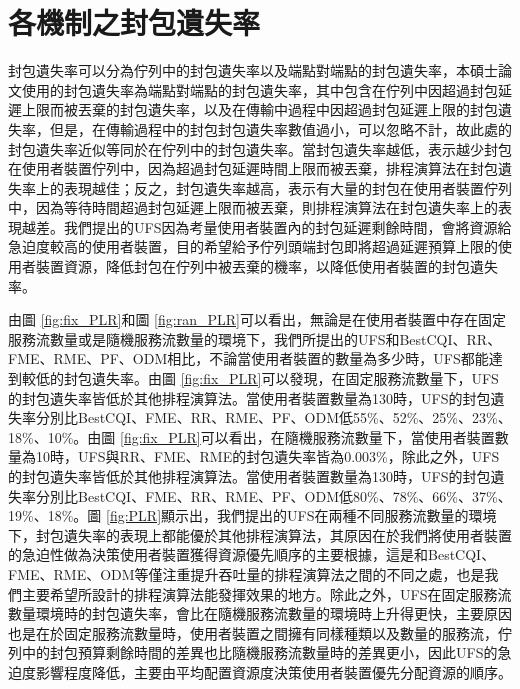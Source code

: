 \section{各機制之封包遺失率}
封包遺失率可以分為佇列中的封包遺失率以及端點對端點的封包遺失率，本碩士論文使用的封包遺失率為端點對端點的封包遺失率，其中包含在佇列中因超過封包延遲上限而被丟棄的封包遺失率，以及在傳輸中過程中因超過封包延遲上限的封包遺失率，但是，在傳輸過程中的封包封包遺失率數值過小，可以忽略不計，故此處的封包遺失率近似等同於在佇列中的封包遺失率。當封包遺失率越低，表示越少封包在使用者裝置佇列中，因為超過封包延遲時間上限而被丟棄，排程演算法在封包遺失率上的表現越佳；反之，封包遺失率越高，表示有大量的封包在使用者裝置佇列中，因為等待時間超過封包延遲上限而被丟棄，則排程演算法在封包遺失率上的表現越差。我們提出的UFS因為考量使用者裝置內的封包延遲剩餘時間，會將資源給急迫度較高的使用者裝置，目的希望給予佇列頭端封包即將超過延遲預算上限的使用者裝置資源，降低封包在佇列中被丟棄的機率，以降低使用者裝置的封包遺失率。

由圖 \ref{fig:fix_PLR}和圖 \ref{fig:ran_PLR}可以看出，無論是在使用者裝置中存在固定服務流數量或是隨機服務流數量的環境下，我們所提出的UFS和BestCQI、RR、FME、RME、PF、ODM相比，不論當使用者裝置的數量為多少時，UFS都能達到較低的封包遺失率。由圖 \ref{fig:fix_PLR}可以發現，在固定服務流數量下，UFS的封包遺失率皆低於其他排程演算法。當使用者裝置數量為130時，UFS的封包遺失率分別比BestCQI、FME、RR、RME、PF、ODM低55\%、52\%、25\%、23\%、18\%、10\%。由圖 \ref{fig:fix_PLR}可以看出，在隨機服務流數量下，當使用者裝置數量為10時，UFS與RR、FME、RME的封包遺失率皆為0.003\%，除此之外，UFS的封包遺失率皆低於其他排程演算法。當使用者裝置數量為130時，UFS的封包遺失率分別比BestCQI、FME、RR、RME、PF、ODM低80\%、78\%、66\%、37\%、19\%、18\%。圖 \ref{fig:PLR}顯示出，我們提出的UFS在兩種不同服務流數量的環境下，封包遺失率的表現上都能優於其他排程演算法，其原因在於我們將使用者裝置的急迫性做為決策使用者裝置獲得資源優先順序的主要根據，這是和BestCQI、FME、RME、ODM等僅注重提升吞吐量的排程演算法之間的不同之處，也是我們主要希望所設計的排程演算法能發揮效果的地方。除此之外，UFS在固定服務流數量環境時的封包遺失率，會比在隨機服務流數量的環境時上升得更快，主要原因也是在於固定服務流數量時，使用者裝置之間擁有同樣種類以及數量的服務流，佇列中的封包預算剩餘時間的差異也比隨機服務流數量時的差異更小，因此UFS的急迫度影響程度降低，主要由平均配置資源度決策使用者裝置優先分配資源的順序。

